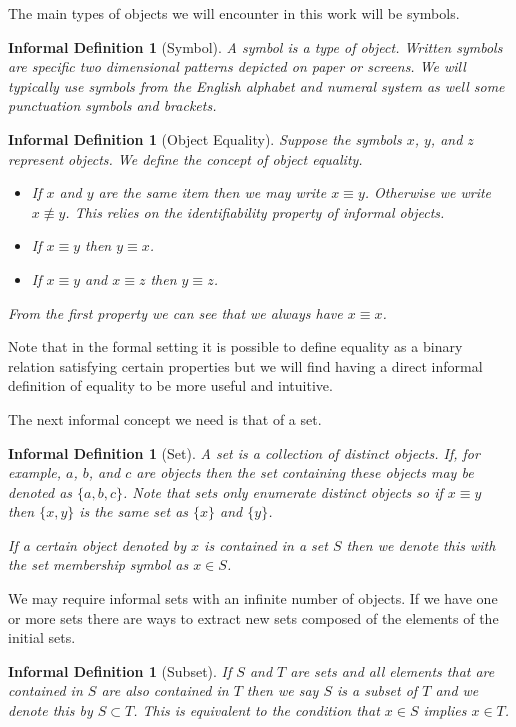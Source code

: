 \documentclass[12pt]{article}
\theoremstyle{break}
\theoremstyle{break}
\theoremstyle{break}
\theoremstyle{break}
\theoremstyle{break}
\newtheorem{informal definition}[definition]{Informal Definition}
\begin{document}
The main types of objects we will encounter in this work will be symbols.
\begin{informal definition}[Symbol]
A symbol is a type of object.
Written symbols are specific two dimensional patterns depicted on paper or screens.
We will typically use symbols from the English alphabet and numeral system as well some punctuation symbols and brackets.
\end{informal definition}

\begin{informal definition}[Object Equality]
Suppose the symbols $x$, $y$, and $z$ represent objects.
We define the concept of object equality.
\begin{itemize}
\item{If $x$ and $y$ are the same item then we may write $x\equiv y$. Otherwise we write $x\not \equiv y$. This relies on the identifiability property of informal objects.}
\item{If $x\equiv y$ then $y\equiv x$.}
\item{If $x\equiv y$ and $x\equiv z$ then $y\equiv z$.}
\end{itemize}
From the first property we can see that we always have $x\equiv x$.
\end{informal definition}
Note that in the formal setting it is possible to define equality as a binary relation satisfying certain properties but we will find having a direct informal definition of equality to be more useful and intuitive.

The next informal concept we need is that of a set.
\begin{informal definition}[Set]
A set is a collection of distinct objects.
If, for example, $a$, $b$, and $c$ are objects then the set containing these objects may be denoted as $\{a, b, c\}$.
Note that sets only enumerate \textit{distinct} objects so if $x\equiv y$ then $\{x, y\}$ is the same set as $\{x\}$ and $\{y\}$.

If a certain object denoted by $x$ is contained in a set $S$ then we denote this with the set membership symbol as $x\in S$.
\end{informal definition}
We may require informal sets with an infinite number of objects.
If we have one or more sets there are ways to extract new sets composed of the elements of the initial sets.

\begin{informal definition}[Subset]
If $S$ and $T$ are sets and all elements that are contained in $S$ are also contained in $T$ then we say $S$ is a subset of $T$ and we denote this by $S\subset T$.
This is equivalent to the condition that $x\in S$ implies $x\in T$.
\end{informal definition}
\end{document}

